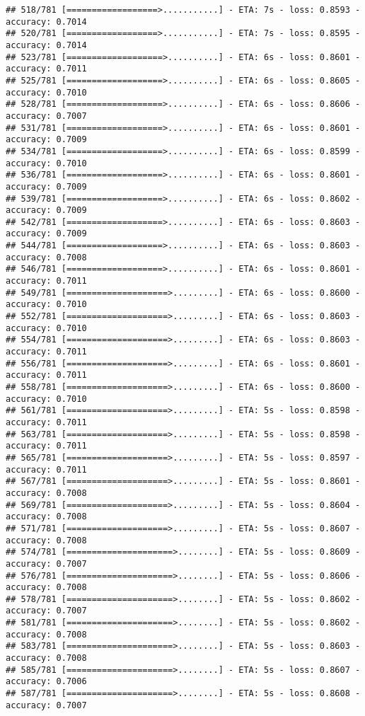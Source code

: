 \documentclass[
]{article}
\begin{document}
\begin{verbatim}
## 518/781 [==================>...........] - ETA: 7s - loss: 0.8593 - accuracy: 0.7014
## 520/781 [==================>...........] - ETA: 7s - loss: 0.8595 - accuracy: 0.7014
## 523/781 [===================>..........] - ETA: 6s - loss: 0.8601 - accuracy: 0.7011
## 525/781 [===================>..........] - ETA: 6s - loss: 0.8605 - accuracy: 0.7010
## 528/781 [===================>..........] - ETA: 6s - loss: 0.8606 - accuracy: 0.7007
## 531/781 [===================>..........] - ETA: 6s - loss: 0.8601 - accuracy: 0.7009
## 534/781 [===================>..........] - ETA: 6s - loss: 0.8599 - accuracy: 0.7010
## 536/781 [===================>..........] - ETA: 6s - loss: 0.8601 - accuracy: 0.7009
## 539/781 [===================>..........] - ETA: 6s - loss: 0.8602 - accuracy: 0.7009
## 542/781 [===================>..........] - ETA: 6s - loss: 0.8603 - accuracy: 0.7009
## 544/781 [===================>..........] - ETA: 6s - loss: 0.8603 - accuracy: 0.7008
## 546/781 [===================>..........] - ETA: 6s - loss: 0.8601 - accuracy: 0.7011
## 549/781 [====================>.........] - ETA: 6s - loss: 0.8600 - accuracy: 0.7010
## 552/781 [====================>.........] - ETA: 6s - loss: 0.8603 - accuracy: 0.7010
## 554/781 [====================>.........] - ETA: 6s - loss: 0.8603 - accuracy: 0.7011
## 556/781 [====================>.........] - ETA: 6s - loss: 0.8601 - accuracy: 0.7011
## 558/781 [====================>.........] - ETA: 6s - loss: 0.8600 - accuracy: 0.7010
## 561/781 [====================>.........] - ETA: 5s - loss: 0.8598 - accuracy: 0.7011
## 563/781 [====================>.........] - ETA: 5s - loss: 0.8598 - accuracy: 0.7011
## 565/781 [====================>.........] - ETA: 5s - loss: 0.8597 - accuracy: 0.7011
## 567/781 [====================>.........] - ETA: 5s - loss: 0.8601 - accuracy: 0.7008
## 569/781 [====================>.........] - ETA: 5s - loss: 0.8604 - accuracy: 0.7008
## 571/781 [====================>.........] - ETA: 5s - loss: 0.8607 - accuracy: 0.7008
## 574/781 [=====================>........] - ETA: 5s - loss: 0.8609 - accuracy: 0.7007
## 576/781 [=====================>........] - ETA: 5s - loss: 0.8606 - accuracy: 0.7008
## 578/781 [=====================>........] - ETA: 5s - loss: 0.8602 - accuracy: 0.7007
## 581/781 [=====================>........] - ETA: 5s - loss: 0.8602 - accuracy: 0.7008
## 583/781 [=====================>........] - ETA: 5s - loss: 0.8603 - accuracy: 0.7008
## 585/781 [=====================>........] - ETA: 5s - loss: 0.8607 - accuracy: 0.7006
## 587/781 [=====================>........] - ETA: 5s - loss: 0.8608 - accuracy: 0.7007

\end{verbatim}
\end{document}
